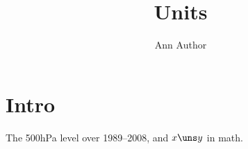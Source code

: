 \documentclass[AMA,STIX1COL]{WileyNJD-v2}
\begin{document}
\title{Units}
\author{Ann Author}
\maketitle
\section{Intro}
The {500{\uns}hPa} level over 1989--2008, and $x{\uns}y$ in math.
\end{document}
